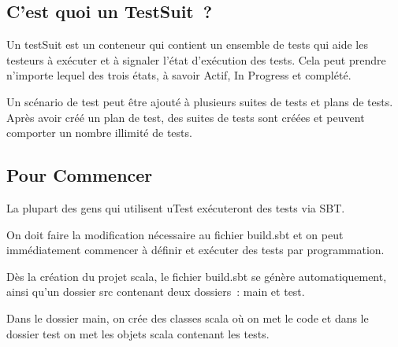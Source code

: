 \documentclass[12pt]{article}
\begin{document}
\vspace{\baselineskip}
\subsection{C’est quoi un TestSuit ?}

\begin{justify}
Un testSuit est un conteneur qui contient un ensemble de tests qui aide les testeurs à exécuter et à signaler l'état d'exécution des tests. Cela peut prendre n'importe lequel des trois états, à savoir Actif, In Progress et complété.
\end{justify}\par

\begin{justify}
Un scénario de test peut être ajouté à plusieurs suites de tests et plans de tests. Après avoir créé un plan de test, des suites de tests sont créées et peuvent comporter un nombre illimité de tests.
\end{justify}\par

\subsection{Pour Commencer }

\begin{justify}
La plupart des gens qui utilisent uTest exécuteront des tests via SBT. 
\end{justify}\par

\begin{justify}
On doit faire la modification nécessaire au fichier build.sbt et on peut immédiatement commencer à définir et exécuter des tests par programmation.
\end{justify}\par

\begin{justify}
Dès la création du projet scala, le fichier build.sbt se génère automatiquement, ainsi qu’un dossier src contenant deux dossiers : main et test.
\end{justify}\par

\begin{justify}
Dans le dossier main, on crée des classes scala où on met le code et dans le dossier test on met les objets scala contenant les tests.
\end{justify}\par
\end{document}
